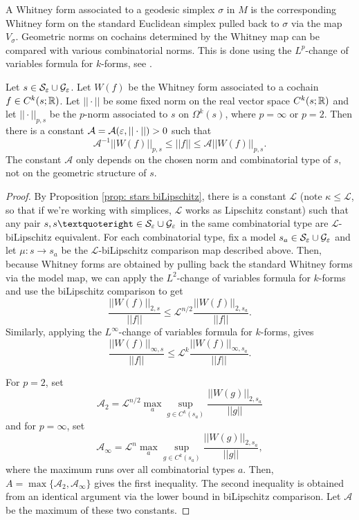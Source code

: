 A Whitney form associated to a geodesic simplex $\sigma$ in $M$ is the corresponding Whitney form on the standard Euclidean simplex pulled back to $\sigma$ via the map $V_\sigma$. Geometric norms on cochains determined by the Whitney map can be compared with various combinatorial norms. This is done using the $L^p$-change of variables formula for $k$-forms, see \cite{stern}.

\begin{prop} \label{prop: L2 comparisons}
Let $s\in\mathcal S_\varepsilon\cup\mathcal G_\varepsilon$. Let $W(f)$ be the Whitney form associated to a cochain $f\in C^{k}(s;\mathbb R)$. Let $||\cdot||$ be some fixed norm on the real vector space $C^{k}(s;\mathbb R)$ and let $||\cdot||_{p,s}$ be the $p$-norm associated to $s$ on  $\Omega^k(s)$, where $p = {\infty}$ or $p=2$.
Then there is a constant $\mathcal A = \mathcal A (\varepsilon,||\cdot||)>0$ such that $$\mathcal A^{-1}||W(f)||_{p,{s}}\leq  \mathcal ||f|| \leq \mathcal A||W(f)||_{p,s}.$$ The constant $\mathcal A$ only depends on the chosen norm and combinatorial type of $s,$ not on the geometric structure of $s$.
\end{prop}
\begin{proof}
By Proposition \ref{prop: stars biLipschitz}, there is a constant $\mathcal L$ (note $\kappa\leq \mathcal L$, so that if we’re working with simplices, $\mathcal L$ works as Lipschitz constant) such that any pair $s,s’\in \mathcal S_\e\cup\mathcal G_\e$ in the same combinatorial type are $\mathcal L$-biLipschitz equivalent.
For each combinatorial type, fix a model $s_a\in \mathcal S_\varepsilon\cup\mathcal G_\varepsilon$ and let $\mu:s\to s_a$ be the $\mathcal L$-biLipschitz comparison map described above. Then, because Whitney forms are obtained by pulling back the standard Whitney forms via the model map, we can apply the $L^2$-change of variables formula for $k$-forms and use the biLipschitz comparison to get $$\frac{||W(f)||_{2,{s}}}{||f||}\leq \mathcal L^{n/2}\frac{||W(f)||_{2,s_a}}{||f||}.$$ Similarly, applying the $L^{\infty}$-change of variables formula for $k$-forms, gives
$$\frac{||W(f)||_{{\infty},s}}{||f||}\leq \mathcal L^{k}\frac{||W(f)||_{\infty,s_a}}{||f||}.$$

For $p=2$, set $$\mathcal A_2 =  \mathcal L^{n/2}\max\limits_a \sup\limits_{g\in C^{k}(s_a)} \frac{||W(g)||_{2,s_a}}{||g||}$$ and for $p = \infty$, set $$\mathcal A_{\infty} = \mathcal L^{n} \max\limits_a\sup\limits_{g\in C^{k}(s_a)} \frac{||W(g)||_{2,s_a}}{||g||},$$
where the maximum runs over all combinatorial types $a$.
Then, $A = \max\{\mathcal A_2,\mathcal A_{\infty}\}$ gives the first inequality.
The second inequality is obtained from an identical argument via the lower bound in biLipschitz comparison. Let $\mathcal A$ be the maximum of these two constants.
\end{proof}

